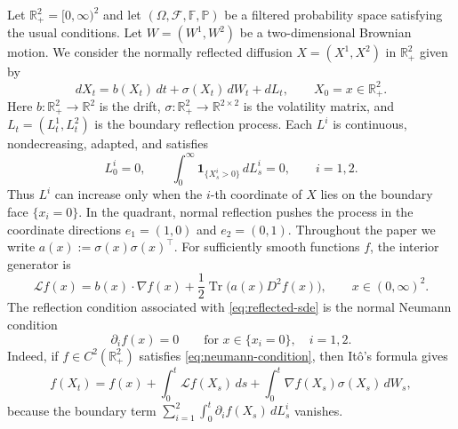 \documentclass[pdflatex,sn-mathphys-num]{sn-jnl}
\theoremstyle{plain}
\theoremstyle{definition}
\theoremstyle{remark}
\numberwithin{equation}{section}
\begin{document}
Let $\mathbb R_+^2=[0,\infty)^2$ and let \((\Omega,\mathcal F,\mathbb F,\mathbb P)\) be a filtered probability space satisfying the usual conditions. Let \(W=(W^1,W^2)\) be a two-dimensional Brownian motion. We consider the normally reflected diffusion \(X=(X^1,X^2)\) in \(\mathbb R_+^2\) given by 
\begin{equation} \label{eq:reflected-sde} 
dX_t=b(X_t)\,dt+\sigma(X_t)\,dW_t+dL_t, \qquad X_0=x\in\mathbb R_+^2 . 
\end{equation} 
Here \(b:\mathbb R_+^2\to\mathbb R^2\) is the drift, \(\sigma:\mathbb R_+^2\to\mathbb R^{2\times 2}\) is the volatility matrix, and $L_t=(L_t^1,L_t^2)$ is the boundary reflection process. Each \(L^i\) is continuous, nondecreasing, adapted, and satisfies 
\[
L_0^i=0, \qquad \int_0^\infty \mathbf 1_{\{X_s^i>0\}}\,dL_s^i=0, \qquad i=1,2 . 
\]
Thus \(L^i\) can increase only when the \(i\)-th coordinate of \(X\) lies on the boundary face \(\{x_i=0\}\). In the quadrant, normal reflection pushes the process in the coordinate directions \(e_1=(1,0)\) and \(e_2=(0,1)\). Throughout the paper we write $a(x):=\sigma(x)\sigma(x)^\top$. 
For sufficiently smooth functions \(f\), the interior generator is 
\[
\mathcal L f(x) = b(x)\cdot \nabla f(x) + \frac12 \operatorname{Tr}\big(a(x)D^2f(x)\big), \qquad x\in (0,\infty)^2 . 
\]
The reflection condition associated with \eqref{eq:reflected-sde} is the normal Neumann condition 
\begin{equation} \label{eq:neumann-condition} 
\partial_i f(x)=0 \qquad \text{for }x\in\{x_i=0\},\quad i=1,2 . \end{equation} 
Indeed, if \(f\in C^2(\mathbb R_+^2)\) satisfies \eqref{eq:neumann-condition}, then It\^{o}'s formula gives 
\[ 
f(X_t) = f(x) + \int_0^t \mathcal L f(X_s)\,ds + \int_0^t \nabla f(X_s)\sigma(X_s)\,dW_s , 
\]
because the boundary term 
$\displaystyle \sum_{i=1}^2\int_0^t \partial_i f(X_s)\,dL_s^i$ 
vanishes. 
\end{document}
